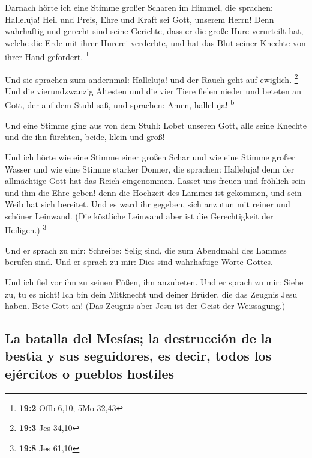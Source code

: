  Darnach hörte ich eine Stimme großer Scharen im Himmel,
die sprachen: Halleluja! Heil und Preis, Ehre und Kraft sei Gott,
unserem Herrn!  Denn wahrhaftig und gerecht sind seine
Gerichte, dass er die große Hure verurteilt hat, welche die Erde mit
ihrer Hurerei verderbte, und hat das Blut seiner Knechte von ihrer Hand
gefordert. \footnote{\textbf{19:2} Offb 6,10; 5Mo 32,43}

 Und sie sprachen zum andernmal: Halleluja! und der Rauch
geht auf ewiglich. \footnote{\textbf{19:3} Jes 34,10}  Und
die vierundzwanzig Ältesten und die vier Tiere fielen nieder und beteten
an Gott, der auf dem Stuhl saß, und sprachen: Amen, halleluja!
\textsuperscript{b}

 Und eine Stimme ging aus von dem Stuhl: Lobet unseren
Gott, alle seine Knechte und die ihn fürchten, beide, klein und groß!

 Und ich hörte wie eine Stimme einer großen Schar und wie
eine Stimme großer Wasser und wie eine Stimme starker Donner, die
sprachen: Halleluja! denn der allmächtige Gott hat das Reich
eingenommen.  Lasset uns freuen und fröhlich sein und ihm
die Ehre geben! denn die Hochzeit des Lammes ist gekommen, und sein Weib
hat sich bereitet.  Und es ward ihr gegeben, sich anzutun
mit reiner und schöner Leinwand. (Die köstliche Leinwand aber ist die
Gerechtigkeit der Heiligen.) \footnote{\textbf{19:8} Jes 61,10}

 Und er sprach zu mir: Schreibe: Selig sind, die zum
Abendmahl des Lammes berufen sind. Und er sprach zu mir: Dies sind
wahrhaftige Worte Gottes.

 Und ich fiel vor ihn zu seinen Füßen, ihn anzubeten. Und
er sprach zu mir: Siehe zu, tu es nicht! Ich bin dein Mitknecht und
deiner Brüder, die das Zeugnis Jesu haben. Bete Gott an! (Das Zeugnis
aber Jesu ist der Geist der Weissagung.)

\hypertarget{la-batalla-del-mesuxedas-la-destrucciuxf3n-de-la-bestia-y-sus-seguidores-es-decir-todos-los-ejuxe9rcitos-o-pueblos-hostiles}{%
\subsection{La batalla del Mesías; la destrucción de la bestia y sus
seguidores, es decir, todos los ejércitos o pueblos
hostiles}\label{la-batalla-del-mesuxedas-la-destrucciuxf3n-de-la-bestia-y-sus-seguidores-es-decir-todos-los-ejuxe9rcitos-o-pueblos-hostiles}}

